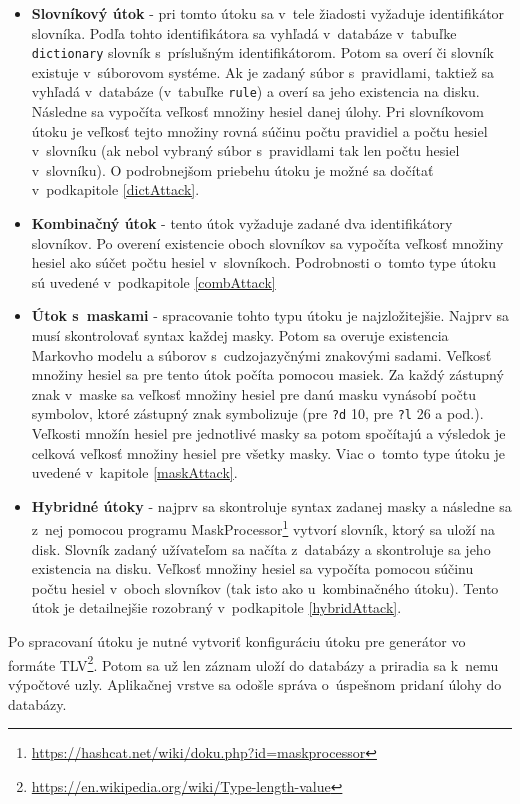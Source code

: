 \documentclass[slovak]{fitthesis}
\begin{document}
\begin{itemize}
    \item \textbf{Slovníkový útok} - pri tomto útoku sa v~tele žiadosti vyžaduje identifikátor slovníka. Podľa tohto identifikátora sa vyhľadá v~databáze v~tabuľke \texttt{dictionary} slovník s~príslušným identifikátorom. Potom sa overí či slovník existuje v~súborovom systéme. Ak je zadaný súbor s~pravidlami, taktiež sa vyhľadá v~databáze (v~tabuľke \texttt{rule}) a overí sa jeho existencia na disku. Následne sa vypočíta veľkosť množiny hesiel danej úlohy. Pri slovníkovom útoku je veľkosť tejto množiny rovná súčinu počtu pravidiel a počtu hesiel v~slovníku (ak nebol vybraný súbor s~pravidlami tak len počtu hesiel v~slovníku). O podrobnejšom priebehu útoku je možné sa dočítať v~podkapitole \ref{dictAttack}.
    \item \textbf{Kombinačný útok} - tento útok vyžaduje zadané dva identifikátory slovníkov. Po overení existencie oboch slovníkov sa vypočíta veľkosť množiny hesiel ako súčet počtu hesiel v~slovníkoch. Podrobnosti o~tomto type útoku sú uvedené v~podkapitole \ref{combAttack}
    \item \textbf{Útok s~maskami} - spracovanie tohto typu útoku je najzložitejšie. Najprv sa musí skontrolovať syntax každej masky. Potom sa overuje existencia Markovho modelu a súborov s~cudzojazyčnými znakovými sadami. Veľkosť množiny hesiel sa pre tento útok počíta pomocou masiek. Za každý zástupný znak v~maske sa veľkosť množiny hesiel pre danú masku vynásobí počtu symbolov, ktoré zástupný znak symbolizuje (pre \texttt{?d} 10, pre \texttt{?l} 26 a pod.). Veľkosti množín hesiel pre jednotlivé masky sa potom spočítajú a výsledok je celková veľkosť množiny hesiel pre všetky masky. Viac o~tomto type útoku je uvedené v~kapitole \ref{maskAttack}.
    \item \textbf{Hybridné útoky} - najprv sa skontroluje syntax zadanej masky a následne sa z~nej pomocou programu MaskProcessor\footnote{\url{https://hashcat.net/wiki/doku.php?id=maskprocessor}} vytvorí slovník, ktorý sa uloží na disk. Slovník zadaný užívateľom sa načíta z~databázy a skontroluje sa jeho existencia na disku. Veľkosť množiny hesiel sa vypočíta pomocou súčinu počtu hesiel v~oboch slovníkov (tak isto ako u~kombinačného útoku). Tento útok je detailnejšie rozobraný v~podkapitole \ref{hybridAttack}.
\end{itemize}
Po spracovaní útoku je nutné vytvoriť konfiguráciu útoku pre generátor vo formáte TLV\footnote{\url{https://en.wikipedia.org/wiki/Type-length-value}}. Potom sa už len záznam uloží do databázy a priradia sa k~nemu výpočtové uzly. Aplikačnej vrstve sa odošle správa o~úspešnom pridaní úlohy do databázy.
\end{document}
